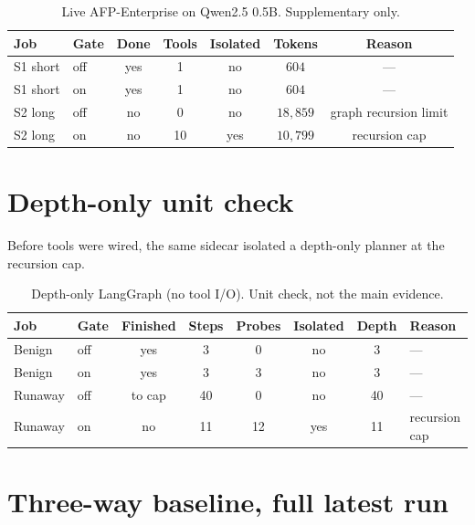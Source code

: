 \documentclass[11pt,a4paper]{article}
\begin{document}
\begin{table}[htbp]
\centering
\caption{Live AFP-Enterprise on Qwen2.5 0.5B. Supplementary only.}
\label{tab:live}
\small
\begin{tabular}{@{}llccccc@{}}
\toprule
Job & Gate & Done & Tools & Isolated & Tokens & Reason \\
\midrule
S1 short & off & yes & 1 & no & $604$ & --- \\
S1 short & on & yes & 1 & no & $604$ & --- \\
S2 long & off & no & 0 & no & $18{,}859$ & graph recursion limit \\
S2 long & on & no & 10 & yes & $10{,}799$ & recursion cap \\
\bottomrule
\end{tabular}
\end{table}

\section{Depth-only unit check}
\label{app:depth}

Before tools were wired, the same sidecar isolated a depth-only planner at the recursion cap.

\begin{table}[htbp]
\centering
\caption{Depth-only LangGraph (no tool I/O). Unit check, not the main evidence.}
\label{tab:depth}
\small
\begin{tabular}{@{}llcccccl@{}}
\toprule
Job & Gate & Finished & Steps & Probes & Isolated & Depth & Reason \\
\midrule
Benign & off & yes & 3 & 0 & no & 3 & --- \\
Benign & on & yes & 3 & 3 & no & 3 & --- \\
Runaway & off & to cap & 40 & 0 & no & 40 & --- \\
Runaway & on & no & 11 & 12 & yes & 11 & recursion cap \\
\bottomrule
\end{tabular}
\end{table}

\section{Three-way baseline, full latest run}
\label{app:full}
\end{document}
